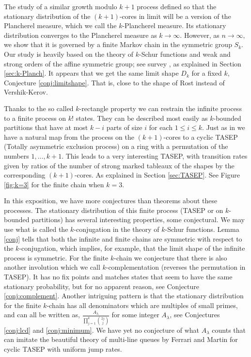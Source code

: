 \documentclass[11pt]{amsart}
\begin{document}
The study of a similar growth modulo $k+1$ process defined so that the stationary distribution of the $(k+1)$-cores in limit will be a version of the Plancherel measure, which we call the $k$-Plancherel measure. Its stationary distribution converges to the Plancherel measure as $k\rightarrow \infty.$ However, as $n\rightarrow \infty,$ we show that it is governed by a finite Markov chain in the symmetric group $S_k.$ Our study is heavily based on the theory of $k$-Schur functions and weak and strong orders of the affine symmetric group; see survey \cite{LLMSSZ14}, as explained in Section \ref{sec:k-Planch}.  It appears that we get the same limit shape $D_k$ for a fixed $k$, Conjecture \ref{conj:limitshape}. That is, close to the shape of Rost instead of Vershik-Kerov.

Thanks to the so called $k$-rectangle property we can restrain the infinite process to a finite process on $k!$ states. They can be described most easily as $k$-bounded partitions that have at most $k-i$ parts of size $i$ for each $1\le i\le k$.  Just as in \cite{AL14,L15} we have a natural map from the process on the $(k+1)$-cores to a cyclic TASEP (Totally asymmetric exclusion process) on a ring with a permutation of the numbers $1,\dots,k+1$. This leads to a very interesting TASEP, with transition rates given by ratios of the number of strong marked tableaux of the shapes by the corresponding $(k+1)$-cores.  As explained in Section \ref{sec:TASEP}. See Figure \ref{fig:k=3} for the finite chain when $k=3$.

In this exposition, we have more conjectures than theorems about these processes. The stationary distribution of this finite process (TASEP or on $k$-bounded partitions) has several interesting properties, some conjectural. We may use what is called the $k$-conjugation in the theory of $k$-Schur functions. Lemma \ref{conj} tells that both the infinite and finite chains are symmetric with respect to the $k$-conjugation, which implies, for example, that the limit shape of the infinite process is symmetric.
For the finite $k$-chain we conjecture that there is also another involution which we call $k$-complementation (reverses the permutation in TASEP). It has no fix points and matches states that seem to have the same stationary probability, but for no apparent reason, see Conjecture \ref{conj:complement}. 
Another intriguing pattern is that the stationary distribution for the finite $k$-chain has all denominators which are multiples of small primes, and can all be written as, $\frac{A_\lambda}{\prod_{j=1}^k\binom{2j}{j}}$ for some integer $A_\lambda$, see Conjectures \ref{conj:lcd} and \ref{conj:minimum}. We have yet no conjecture of what $A_\lambda$ counts that can imitate the beautiful theory of multi-line queues by Ferrari and Martin \cite{FM07} for cyclic TASEP with uniform jump rates.
\end{document}
